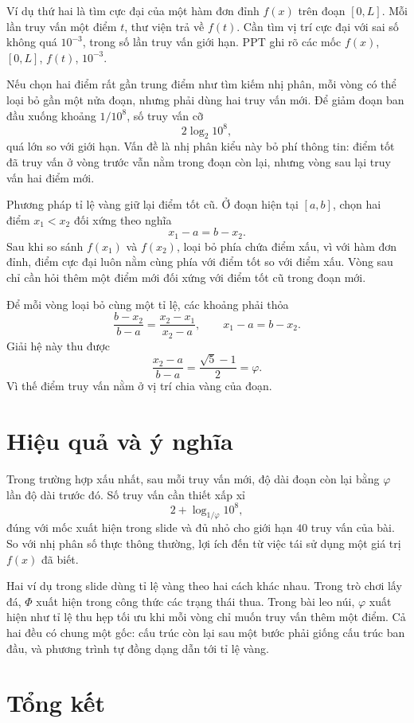 \documentclass[11pt]{article}
\begin{document}
Ví dụ thứ hai là tìm cực đại của một hàm đơn đỉnh \(f(x)\) trên đoạn
\([0,L]\). Mỗi lần truy vấn một điểm \(t\), thư viện trả về \(f(t)\). Cần tìm
vị trí cực đại với sai số không quá \(10^{-3}\), trong số lần truy vấn giới
hạn. PPT ghi rõ các mốc \(f(x)\), \([0,L]\), \(f(t)\), \(10^{-3}\).

Nếu chọn hai điểm rất gần trung điểm như tìm kiếm nhị phân, mỗi vòng có thể
loại bỏ gần một nửa đoạn, nhưng phải dùng hai truy vấn mới. Để giảm đoạn ban
đầu xuống khoảng \(1/10^8\), số truy vấn cỡ
\[
  2\log_2 10^8,
\]
quá lớn so với giới hạn. Vấn đề là nhị phân kiểu này bỏ phí thông tin: điểm
tốt đã truy vấn ở vòng trước vẫn nằm trong đoạn còn lại, nhưng vòng sau lại
truy vấn hai điểm mới.

Phương pháp tỉ lệ vàng giữ lại điểm tốt cũ. Ở đoạn hiện tại \([a,b]\), chọn
hai điểm \(x_1<x_2\) đối xứng theo nghĩa
\[
  x_1-a=b-x_2.
\]
Sau khi so sánh \(f(x_1)\) và \(f(x_2)\), loại bỏ phía chứa điểm xấu, vì với
hàm đơn đỉnh, điểm cực đại luôn nằm cùng phía với điểm tốt so với điểm xấu.
Vòng sau chỉ cần hỏi thêm một điểm mới đối xứng với điểm tốt cũ trong đoạn
mới.

Để mỗi vòng loại bỏ cùng một tỉ lệ, các khoảng phải thỏa
\[
  \frac{b-x_2}{b-a}
  =
  \frac{x_2-x_1}{x_2-a},
  \qquad
  x_1-a=b-x_2.
\]
Giải hệ này thu được
\[
  \frac{x_2-a}{b-a}=\frac{\sqrt5-1}{2}=\varphi.
\]
Vì thế điểm truy vấn nằm ở vị trí chia vàng của đoạn.

\section{Hiệu quả và ý nghĩa}

Trong trường hợp xấu nhất, sau mỗi truy vấn mới, độ dài đoạn còn lại bằng
\(\varphi\) lần độ dài trước đó. Số truy vấn cần thiết xấp xỉ
\[
  2+\log_{1/\varphi}10^8,
\]
đúng với mốc xuất hiện trong slide và đủ nhỏ cho giới hạn \(40\) truy vấn của
bài. So với nhị phân số thực thông thường, lợi ích đến từ việc tái sử dụng
một giá trị \(f(x)\) đã biết.

Hai ví dụ trong slide dùng tỉ lệ vàng theo hai cách khác nhau. Trong trò chơi
lấy đá, \(\Phi\) xuất hiện trong công thức các trạng thái thua. Trong bài
leo núi, \(\varphi\) xuất hiện như tỉ lệ thu hẹp tối ưu khi mỗi vòng chỉ muốn
truy vấn thêm một điểm. Cả hai đều có chung một gốc: cấu trúc còn lại sau một
bước phải giống cấu trúc ban đầu, và phương trình tự đồng dạng dẫn tới tỉ lệ
vàng.

\section{Tổng kết}
\end{document}
